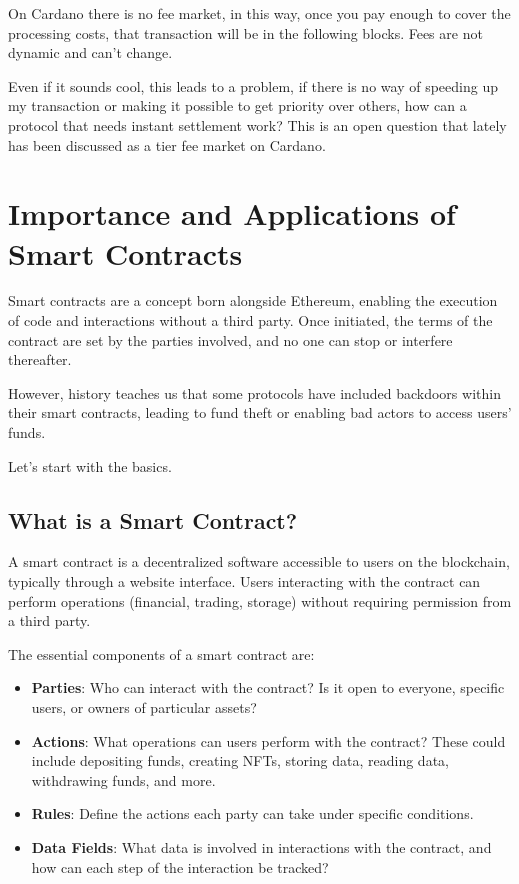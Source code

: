 On Cardano there is no fee market, in this way, once you pay enough to cover the processing costs, that transaction will be in the following blocks. Fees are not dynamic and can't change.

Even if it sounds cool, this leads to a problem, if there is no way of speeding up my transaction or making it possible to get priority over others, how can a protocol that needs instant settlement work?
This is an open question that lately has been discussed as a tier fee market on Cardano.

\newpage


\section{Importance and Applications of Smart Contracts}

Smart contracts are a concept born alongside Ethereum, enabling the execution of code and interactions without a third party. Once initiated, the terms of the contract are set by the parties involved, and no one can stop or interfere thereafter.

However, history teaches us that some protocols have included backdoors within their smart contracts, leading to fund theft or enabling bad actors to access users' funds.

Let's start with the basics.

\subsection{What is a Smart Contract?}

A smart contract is a decentralized software accessible to users on the blockchain, typically through a website interface. Users interacting with the contract can perform operations (financial, trading, storage) without requiring permission from a third party.

The essential components of a smart contract are:

\begin{itemize}
\item \textbf{Parties}: Who can interact with the contract? Is it open to everyone, specific users, or owners of particular assets?
\item \textbf{Actions}: What operations can users perform with the contract? These could include depositing funds, creating NFTs, storing data, reading data, withdrawing funds, and more.
\item \textbf{Rules}: Define the actions each party can take under specific conditions.
\item \textbf{Data Fields}: What data is involved in interactions with the contract, and how can each step of the interaction be tracked?
\end{itemize}
